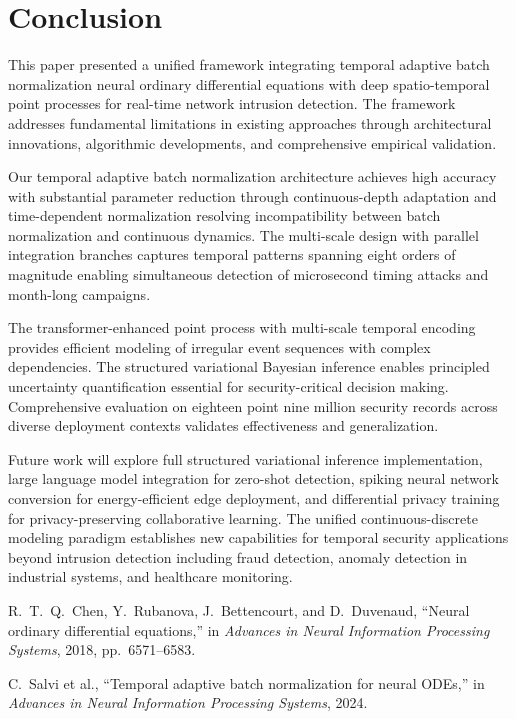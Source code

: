 \documentclass[10pt,journal,compsoc]{IEEEtran}
\begin{document}
\section{Conclusion}
\label{sec:conclusion}

This paper presented a unified framework integrating temporal adaptive batch normalization neural ordinary differential equations with deep spatio-temporal point processes for real-time network intrusion detection. The framework addresses fundamental limitations in existing approaches through architectural innovations, algorithmic developments, and comprehensive empirical validation.

Our temporal adaptive batch normalization architecture achieves high accuracy with substantial parameter reduction through continuous-depth adaptation and time-dependent normalization resolving incompatibility between batch normalization and continuous dynamics. The multi-scale design with parallel integration branches captures temporal patterns spanning eight orders of magnitude enabling simultaneous detection of microsecond timing attacks and month-long campaigns.

The transformer-enhanced point process with multi-scale temporal encoding provides efficient modeling of irregular event sequences with complex dependencies. The structured variational Bayesian inference enables principled uncertainty quantification essential for security-critical decision making. Comprehensive evaluation on eighteen point nine million security records across diverse deployment contexts validates effectiveness and generalization.

Future work will explore full structured variational inference implementation, large language model integration for zero-shot detection, spiking neural network conversion for energy-efficient edge deployment, and differential privacy training for privacy-preserving collaborative learning. The unified continuous-discrete modeling paradigm establishes new capabilities for temporal security applications beyond intrusion detection including fraud detection, anomaly detection in industrial systems, and healthcare monitoring.

\begin{thebibliography}{99}

R.~T.~Q.~Chen, Y.~Rubanova, J.~Bettencourt, and D.~Duvenaud,
``Neural ordinary differential equations,''
in \emph{Advances in Neural Information Processing Systems}, 2018, pp.~6571--6583.

C.~Salvi et al.,
``Temporal adaptive batch normalization for neural ODEs,''
in \emph{Advances in Neural Information Processing Systems}, 2024.

\end{thebibliography}
\end{document}
